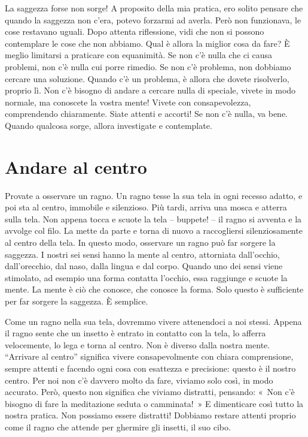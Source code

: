 La saggezza forse non sorge! A proposito della mia pratica, ero solito
pensare che quando la saggezza non c'era, potevo forzarmi ad averla.
Però non funzionava, le cose restavano uguali. Dopo attenta riflessione,
vidi che non si possono contemplare le cose che non abbiamo. Qual è
allora la miglior cosa da fare? È meglio limitarsi a praticare con
equanimità. Se non c'è nulla che ci causa problemi, non c'è nulla cui
porre rimedio. Se non c'è problema, non dobbiamo cercare una soluzione.
Quando c'è un problema, è allora che dovete risolverlo, proprio lì. Non
c'è bisogno di andare a cercare nulla di speciale, vivete in modo
normale, ma conoscete la vostra mente! Vivete con consapevolezza,
comprendendo chiaramente. Siate attenti e accorti! Se non c'è nulla, va
bene. Quando qualcosa sorge, allora investigate e contemplate.

\section{Andare al centro}

Provate a osservare un ragno. Un ragno tesse la sua tela in ogni recesso
adatto, e poi sta al centro, immobile e silenzioso. Più tardi, arriva
una mosca e atterra sulla tela. Non appena tocca e scuote la tela --
buppete! -- il ragno si avventa e la avvolge col filo. La mette da parte
e torna di nuovo a raccogliersi silenziosamente al centro della tela. In
questo modo, osservare un ragno può far sorgere la saggezza. I nostri
sei sensi hanno la mente al centro, attorniata dall'occhio,
dall'orecchio, dal naso, dalla lingua e dal corpo. Quando uno dei sensi
viene stimolato, ad esempio una forma contatta l'occhio, essa raggiunge
e scuote la mente. La mente è ciò che conosce, che conosce la forma.
Solo questo è sufficiente per far sorgere la saggezza. È semplice.

Come un ragno nella sua tela, dovremmo vivere attenendoci a noi stessi.
Appena il ragno sente che un insetto è entrato in contatto con la tela,
lo afferra velocemente, lo lega e torna al centro. Non è diverso dalla
nostra mente. ``Arrivare al centro'' significa vivere consapevolmente
con chiara comprensione, sempre attenti e facendo ogni cosa con
esattezza e precisione: questo è il nostro centro. Per noi non c'è
davvero molto da fare, viviamo solo così, in modo accurato. Però, questo
non significa che viviamo distratti, pensando: «~Non c'è bisogno di fare
la meditazione seduta o camminata!~» E dimenticare così tutto la nostra
pratica. Non possiamo essere distratti! Dobbiamo restare attenti proprio
come il ragno che attende per ghermire gli insetti, il suo cibo.

